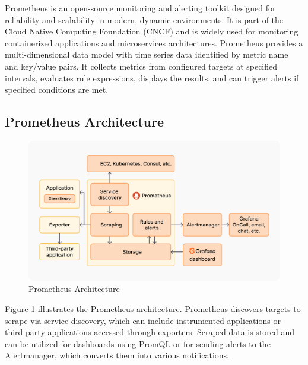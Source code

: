 Prometheus is an open-source monitoring and alerting toolkit designed for reliability and scalability in modern, dynamic environments. It is part of the Cloud Native Computing Foundation (CNCF) and is widely used for monitoring containerized applications and microservices architectures. Prometheus provides a multi-dimensional data model with time series data identified by metric name and key/value pairs. It collects metrics from configured targets at specified intervals, evaluates rule expressions, displays the results, and can trigger alerts if specified conditions are met.

\subsection*{Prometheus Architecture}

\begin{figure}[H]
  \centering
  \includegraphics[width=16cm]{Figures/prometheus-grafana-architecture-diagram.png}
  \caption{Prometheus Architecture}
  \label{fig:prometheus_architecture}
\end{figure}

Figure \ref{fig:prometheus_architecture} illustrates the Prometheus architecture. Prometheus discovers targets to scrape via service discovery, which can include instrumented applications or third-party applications accessed through exporters. Scraped data is stored and can be utilized for dashboards using PromQL or for sending alerts to the Alertmanager, which converts them into various notifications.

